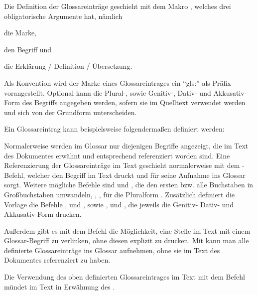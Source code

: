Die Definition der Glossareinträge geschieht mit dem Makro ,
welches drei obligatorische Argumente hat, nämlich
\begin{itemize*}
\item die Marke,
\item den Begriff und
\item die Erklärung / Definition / Übersetzung.
\end{itemize*}
Als Konvention wird der Marke eines Glossareintrages ein \enquote{gls:} als Präfix vorangestellt.
Optional kann die Plural-, sowie Genitiv-, Dativ- und Akkusativ-Form des Begriffs angegeben werden,
sofern sie im Quelltext verwendet werden und sich von der Grundform unterscheiden.

Ein Glossareintrag kann beispielsweise folgendermaßen definiert werden:
\begin{latex}[caption={Definition eines Glossareintrages},label={lst:GlossEntry}]
\end{latex}

Normalerweise werden im Glossar nur diejenigen Begriffe angezeigt,
die im Text des Dokumentes erwähnt und entsprechend referenziert worden sind.
Eine Referenzierung der Glossareinträge im Text geschieht normalerweise mit dem
-Befehl,
welcher den Begriff im Text druckt und für seine Aufnahme ins Glossar sorgt.
Weitere mögliche Befehle sind  und ,
die den ersten bzw. alle Buchstaben in Großbuchstaben umwandeln,
, ,  für die Pluralform \usw.
Zusätzlich definiert die Vorlage die Befehle
,  und , sowie
,  und ,
die jeweils die Genitiv- Dativ- und Akkusativ-Form drucken.

Außerdem gibt es mit dem Befehl  die Möglichkeit,
eine Stelle im Text mit einem Glossar-Begriff zu verlinken, ohne diesen explizit zu drucken.
Mit  kann man alle definierte Glossareinträge ins Glossar aufnehmen,
ohne sie im Text des Dokumentes referenziert zu haben.

Die Verwendung des oben definierten Glossareintrages im Text mit dem Befehl
 mündet im Text in Erwähnung des .


